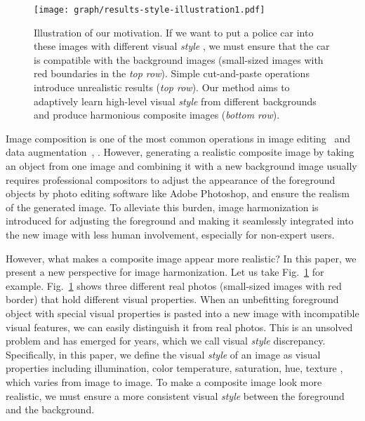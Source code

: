 \documentclass[final]{cvpr}
\begin{document}
\begin{figure}
\begin{center}
\texttt{[image: graph/results-style-illustration1.pdf]}\\
\end{center}
   \caption{Illustration of our motivation. If we want to put a police car into these images with different visual \emph{style} , we must ensure that the car is compatible with the background images (small-sized images with red boundaries in the \emph{top row}). Simple cut-and-paste operations introduce unrealistic results (\emph{top row}). Our method aims to adaptively learn high-level visual \emph{style} from different backgrounds and produce harmonious composite images (\emph{bottom row}).}
\label{fig:toyexample}
\end{figure}

Image composition is one of the most common operations in image editing~\cite{xue2012understanding,cun2020improving} and data augmentation~\cite{dwibedi2017cut,zhang2020learning}, \etc. However, generating a realistic composite image by taking an object from one image and combining it with a new background image usually requires professional compositors to adjust the appearance of the foreground objects by photo editing software like Adobe Photoshop, and ensure the realism of the generated image. To alleviate this burden, image harmonization is introduced for adjusting the foreground and making it seamlessly integrated into the new image with less human involvement, especially for non-expert users. 


However, what makes a composite image appear more realistic? In this paper, we present a new perspective for image harmonization. Let us take Fig.~\ref{fig:toyexample} for example. Fig.~\ref{fig:toyexample} shows three different real photos (small-sized images with red border) that hold different visual properties. When an unbefitting foreground object with special visual properties is pasted into a new image with incompatible visual features, we can easily distinguish it from real photos. This is an unsolved problem and has emerged for years, which we call visual \emph{style} discrepancy. Specifically, in this paper, we define the visual \emph{style} of an image as visual properties including illumination, color temperature, saturation, hue, texture \etc, which varies from image to image. To make a composite image look more realistic, we must ensure a more consistent visual \emph{style} between the foreground and the background. 
\end{document}
